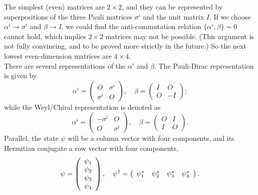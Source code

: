 \documentclass{article}
\newcommand{\be}{\begin{equation}}
\newcommand{\ee}{\end{equation}}
\newcommand{\ba}{\begin{array}}
\newcommand{\ea}{\end{array}}
\newcommand{\1}{\left}
\newcommand{\2}{\right}
\newcommand{\al}{\alpha}
\newcommand{\bet}{\beta}
\newcommand{\sig}{\sigma}
\begin{document}
The simplest (even) matrices are $2\times 2$, and they can be represented by superpositions of the three Pauli matrices $\sig^i$ and the unit matrix $I$. If we choose $\al^i\rightarrow\sig^i$ and $\bet\rightarrow I$, we could find the anti-commutation relation $\{\al^i,\bet\}=0$ cannot hold, which implies $2\times2$ matrices may not be possible. (This argument is not fully convincing, and to be proved more strictly in the future.) So the next lowest even-dimension matrices are $4\times4$.\\

There are several representations of the $\al^i$ and $\bet$. The Pauli-Dirac representation is given by
\be
\al^i=\1(\ba{cc}O&\sig^i\\\sig^i&O\ea\2), \quad \bet=\1(\ba{cc}I&O\\O&-I\ea\2);
\ee
while the Weyl/Chiral representation is denoted as 
\be
\al^i=\1(\ba{cc}-\sig^i&O\\O&\sig^i\ea\2), \quad \bet=\1(\ba{cc}O&I\\I&O\ea\2).
\ee
Parallel, the state $\psi$ will be a column vector with four components, and its Hermitian conjugate a row vector with four components,
\be
\psi=\1(\ba{c}\psi_1\\\psi_2\\\psi_3\\\psi_4\ea\2), \quad \psi^\dagger=\1(\ba{cccc}\psi_1^*&\psi_2^*&\psi_3^*&\psi_4^*\ea\2).\\
\ee
\end{document}
